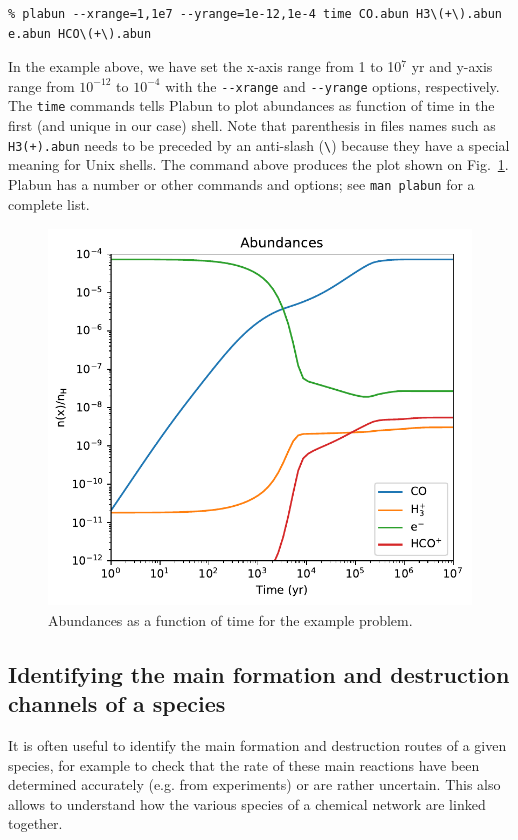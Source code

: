 \documentclass[a4paper,12pt]{article}
\begin{document}
\begin{verbatim}
% plabun --xrange=1,1e7 --yrange=1e-12,1e-4 time CO.abun H3\(+\).abun
e.abun HCO\(+\).abun
\end{verbatim}

In the example above, we have set the x-axis range from 1 to 10$^{7}$
yr and y-axis range from $10^{-12}$ to $10^{-4}$ with the
\verb=--xrange= and \verb=--yrange= options, respectively. The
\verb=time= commands tells Plabun to plot abundances as function of
time in the first (and unique in our case) shell. Note that
parenthesis in files names such as \verb=H3(+).abun= needs to be
preceded by an anti-slash (\verb=\=) because they have a special
meaning for Unix shells. The command above produces the plot shown on
Fig.~\ref{fig:example-abundances}. Plabun has a number or other
commands and options; see \verb=man plabun= for a complete list.

\begin{figure}
  \begin{center}
    \includegraphics[height=10cm]{fig1.pdf}
  \end{center}
  \caption{Abundances as a function of time for the example problem.}
  \label{fig:example-abundances}
\end{figure}

\subsection{Identifying the main formation and destruction channels of
   a species}
\label{sec:ident-main-form}

It is often useful to identify the main formation and destruction
routes of a given species, for example to check that the rate of these
main reactions have been determined accurately (e.g. from experiments)
or are rather uncertain. This also allows to understand how the
various species of a chemical network are linked together.
\end{document}
